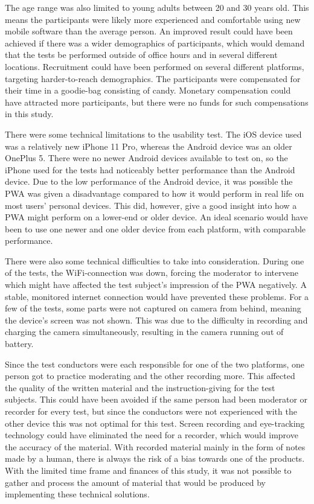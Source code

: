 The age range was also limited to young adults between 20 and 30 years old. This means the participants were likely more experienced and comfortable using new mobile software than the average person. An improved result could have been achieved if there was a wider demographics of participants, which would demand that the tests be performed outside of office hours and in several different locations. Recruitment could have been performed on several different platforms, targeting harder-to-reach demographics. The participants were compensated for their time in a goodie-bag consisting of candy. Monetary compensation could have attracted more participants, but there were no funds for such compensations in this study.

There were some technical limitations to the usability test. The iOS device used was a relatively new iPhone 11 Pro, whereas the Android device was an older OnePlus 5. There were no newer Android devices available to test on, so the iPhone used for the tests had noticeably better performance than the Android device. Due to the low performance of the Android device, it was possible the PWA was given a disadvantage compared to how it would perform in real life on most users' personal devices. This did, however, give a good insight into how a PWA might perform on a lower-end or older device.  An ideal scenario would have been to use one newer and one older device from each platform, with comparable performance.

There were also some technical difficulties to take into consideration. During one of the tests, the WiFi-connection was down, forcing the moderator to intervene which might have affected the test subject's impression of the PWA negatively. A stable, monitored internet connection would have prevented these problems. For a few of the tests, some parts were not captured on camera from behind, meaning the device's screen was not shown. This was due to the difficulty in recording and charging the camera simultaneously, resulting in the camera running out of battery.

Since the test conductors were each responsible for one of the two platforms, one person got to practice moderating and the other recording more. This affected the quality of the written material and the instruction-giving for the test subjects. This could have been avoided if the same person had been moderator or recorder for every test, but since the conductors were not experienced with the other device this was not optimal for this test. Screen recording and eye-tracking technology could have eliminated the need for a recorder, which would improve the accuracy of the material. With recorded material mainly in the form of notes made by a human, there is always the risk of a bias towards one of the products. With the limited time frame and finances of this study, it was not possible to gather and process the amount of material that would be produced by implementing these technical solutions.

